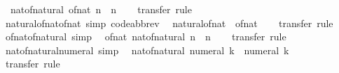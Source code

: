 \begin{isabellebody}
\ \ {\isachardoublequoteopen}nat{\isacharunderscore}{\kern0pt}of{\isacharunderscore}{\kern0pt}natural\ {\isacharparenleft}{\kern0pt}of{\isacharunderscore}{\kern0pt}nat\ n{\isacharparenright}{\kern0pt}\ {\isacharequal}{\kern0pt}\ n{\isachardoublequoteclose}\isanewline
%
\isadelimproof
\ \ %
\endisadelimproof
%
\isatagproof
{}\isamarkupfalse%
\ transfer\ rule%
\endisatagproof
{\isafoldproof}%
%
\isadelimproof
\isanewline
%
\endisadelimproof
\isanewline
{}\isamarkupfalse%
\ natural{\isacharunderscore}{\kern0pt}of{\isacharunderscore}{\kern0pt}nat{\isacharunderscore}{\kern0pt}of{\isacharunderscore}{\kern0pt}nat\ {\isacharbrackleft}{\kern0pt}simp{\isacharcomma}{\kern0pt}\ code{\isacharunderscore}{\kern0pt}abbrev{\isacharbrackright}{\kern0pt}{\isacharcolon}{\kern0pt}\isanewline
\ \ {\isachardoublequoteopen}natural{\isacharunderscore}{\kern0pt}of{\isacharunderscore}{\kern0pt}nat\ {\isacharequal}{\kern0pt}\ of{\isacharunderscore}{\kern0pt}nat{\isachardoublequoteclose}\isanewline
%
\isadelimproof
\ \ %
\endisadelimproof
%
\isatagproof
{}\isamarkupfalse%
\ transfer\ rule%
\endisatagproof
{\isafoldproof}%
%
\isadelimproof
\isanewline
%
\endisadelimproof
\isanewline
{}\isamarkupfalse%
\ of{\isacharunderscore}{\kern0pt}nat{\isacharunderscore}{\kern0pt}of{\isacharunderscore}{\kern0pt}natural\ {\isacharbrackleft}{\kern0pt}simp{\isacharbrackright}{\kern0pt}{\isacharcolon}{\kern0pt}\isanewline
\ \ {\isachardoublequoteopen}of{\isacharunderscore}{\kern0pt}nat\ {\isacharparenleft}{\kern0pt}nat{\isacharunderscore}{\kern0pt}of{\isacharunderscore}{\kern0pt}natural\ n{\isacharparenright}{\kern0pt}\ {\isacharequal}{\kern0pt}\ n{\isachardoublequoteclose}\isanewline
%
\isadelimproof
\ \ %
\endisadelimproof
%
\isatagproof
{}\isamarkupfalse%
\ transfer\ rule%
\endisatagproof
{\isafoldproof}%
%
\isadelimproof
\isanewline
%
\endisadelimproof
\isanewline
{}\isamarkupfalse%
\ nat{\isacharunderscore}{\kern0pt}of{\isacharunderscore}{\kern0pt}natural{\isacharunderscore}{\kern0pt}numeral\ {\isacharbrackleft}{\kern0pt}simp{\isacharbrackright}{\kern0pt}{\isacharcolon}{\kern0pt}\isanewline
\ \ {\isachardoublequoteopen}nat{\isacharunderscore}{\kern0pt}of{\isacharunderscore}{\kern0pt}natural\ {\isacharparenleft}{\kern0pt}numeral\ k{\isacharparenright}{\kern0pt}\ {\isacharequal}{\kern0pt}\ numeral\ k{\isachardoublequoteclose}\isanewline
%
\isadelimproof
\ \ %
\endisadelimproof
%
\isatagproof
{}\isamarkupfalse%
\ transfer\ rule%
\endisatagproof
{\isafoldproof}%
%
\isadelimproof
\isanewline
%
\endisadelimproof

\end{isabellebody}
